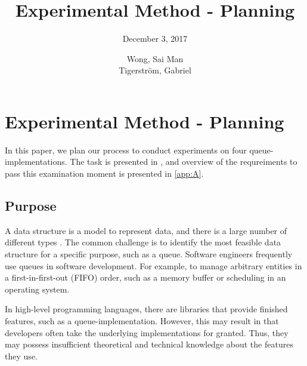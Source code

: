 \documentclass[a4paper,11pt]{kth-mag}
\title{Experimental Method - Planning}
\subtitle{December 3, 2017}
\author{Wong, Sai Man\\ Tigerstr\"{o}m, Gabriel}
\newcommand*{\skippara}{\par\vspace{\baselineskip} \noindent}
\begin{document}
\frontmatter
\pagestyle{empty}
\removepagenumbers
\maketitle
{}



{
      \hypersetup{linkcolor=black}
      \tableofcontents*
}
\mainmatter
\pagestyle{newchap}

\chapter{Experimental Method - Planning}
In this paper, we plan our process to conduct experiments on four queue-implementations.
The task is presented in \cite{Uppgiftl9:online}, and overview of the requreiments to pass this examination moment is presented in \cref{app:A}.

\section{Purpose}\label{sec:purpose}
A data structure is a model to represent data, and there is a large number of different types \cite{deshpande2004c}.
The common challenge is to identify the most feasible data structure for a specific purpose, such as a queue.
Software engineers frequently use queues in software development.
For example, to manage arbitrary entities in a first-in-first-out (FIFO) order, such as a memory buffer or scheduling in an operating system.

\skippara In high-level programming languages, there are libraries that provide finished features, such as a queue-implementation.
However, this may result in that developers often take the underlying implementations for granted.
Thus, they may possess insufficient theoretical and technical knowledge about the features they use.
\end{document}
